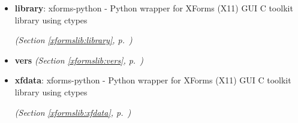 \begin{itemize}
\item \textbf{library}: 
xforms-python - Python wrapper for XForms (X11) GUI C toolkit library
using ctypes




  \textit{(Section \ref{xformslib:library}, p.~\pageref{xformslib:library})}

\item \textbf{vers}
  \textit{(Section \ref{xformslib:vers}, p.~\pageref{xformslib:vers})}

\item \textbf{xfdata}: 
xforms-python - Python wrapper for XForms (X11) GUI C toolkit library
using ctypes




  \textit{(Section \ref{xformslib:xfdata}, p.~\pageref{xformslib:xfdata})}

\end{itemize}

